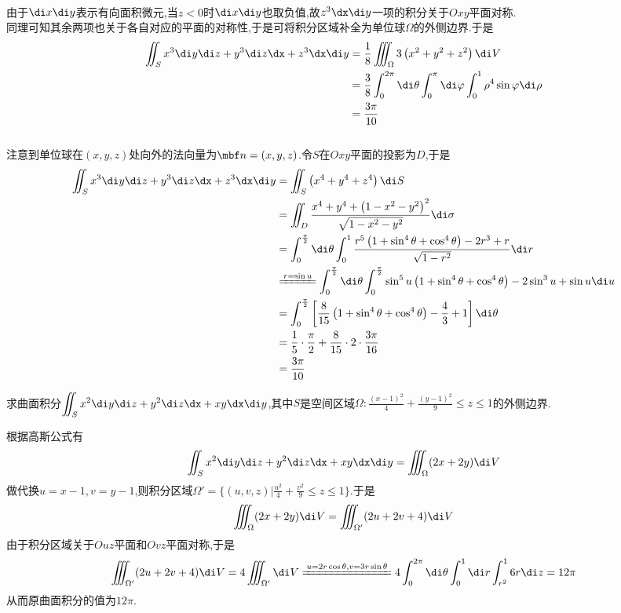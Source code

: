 \documentclass{ctexart}
\begin{document}
\begin{solution}
    \\
    由于$\di x\di y$表示有向面积微元,当$z<0$时$\di x\di y$也取负值,故$z^3\dx\di y$一项的积分关于$Oxy$平面对称.\\
    同理可知其余两项也关于各自对应的平面的对称性,于是可将积分区域补全为单位球$\Omega$的外侧边界.于是
    \[\begin{aligned}
        \iint_{S}x^3\di y\di z+y^3\di z\dx+z^3\dx\di y
        &= \dfrac{1}{8}\iiint_{\Omega}3\left(x^2+y^2+z^2\right)\di V \\
        &= \dfrac{3}{8}\int_{0}^{2\pi}\di\theta\int_{0}^{\pi}\di\varphi\int_{0}^{1}\rho^4\sin\varphi\di\rho \\
        &= \dfrac{3\pi}{10}
    \end{aligned}\]
    \\
    注意到单位球在$(x,y,z)$处向外的法向量为$\mbf n=(x,y,z)$.令$S$在$Oxy$平面的投影为$D$,于是
    \[\begin{aligned}
        \iint_{S}x^3\di y\di z+y^3\di z\dx+z^3\dx\di y
        &= \iint_{S}\left(x^4+y^4+z^4\right)\di S \\
        &= \iint_{D}\dfrac{x^4+y^4+\left(1-x^2-y^2\right)^2}{\sqrt{1-x^2-y^2}}\di\sigma \\
        &= \int_{0}^{\frac\pi2}\di\theta\int_0^1\dfrac{r^5\left(1+\sin^4\theta+\cos^4\theta\right)-2r^3+r}{\sqrt{1-r^2}}\di r \\
        &\xlongequal{r=\sin u}\int_0^{\frac\pi2}\di\theta\int_0^{\frac\pi2}\sin^5u\left(1+\sin^4\theta+\cos^4\theta\right)-2\sin^3u+\sin u\di u \\
        &= \int_{0}^{\frac\pi2}\left[\dfrac{8}{15}\left(1+\sin^4\theta+\cos^4\theta\right)-\dfrac43+1\right]\di\theta \\
        &= \dfrac{1}{5}\cdot\dfrac\pi2+\dfrac{8}{15}\cdot2\cdot\dfrac{3\pi}{16} \\
        &= \dfrac{3\pi}{10}
    \end{aligned}\]
\end{solution}
\begin{problem}[L.6.3]
    求曲面积分$\displaystyle\iint_{S}x^2\di y\di z+y^2\di z\dx+xy\dx\di y$,其中$S$是空间区域$\Omega:\frac{(x-1)^2}{4}+\frac{(y-1)^2}{9}\leqslant z\leqslant1$的外侧边界.
\end{problem}
\begin{solution}
    根据高斯公式有
    \[\iint_{S}x^2\di y\di z+y^2\di z\dx+xy\dx\di y=\iiint_{\Omega}(2x+2y)\di V\]
    做代换$u=x-1,v=y-1$,则积分区域$\Omega'=\{(u,v,z)|\frac{u^2}{4}+\frac{v^2}{9}\leqslant z\leqslant1\}$.于是
    \[\iiint_{\Omega}(2x+2y)\di V=\iiint_{\Omega'}(2u+2v+4)\di V\]
    由于积分区域关于$Ouz$平面和$Ovz$平面对称,于是
    \[\iiint_{\Omega'}(2u+2v+4)\di V
    = 4\iiint_{\Omega'}\di V 
    \xlongequal{u=2r\cos\theta,v=3r\sin\theta} 4\int_{0}^{2\pi}\di\theta\int_0^1\di r\int_{r^2}^{1}6r\di z 
    = 12\pi
    \]
    从而原曲面积分的值为$12\pi$.
\end{solution}
\end{document}
